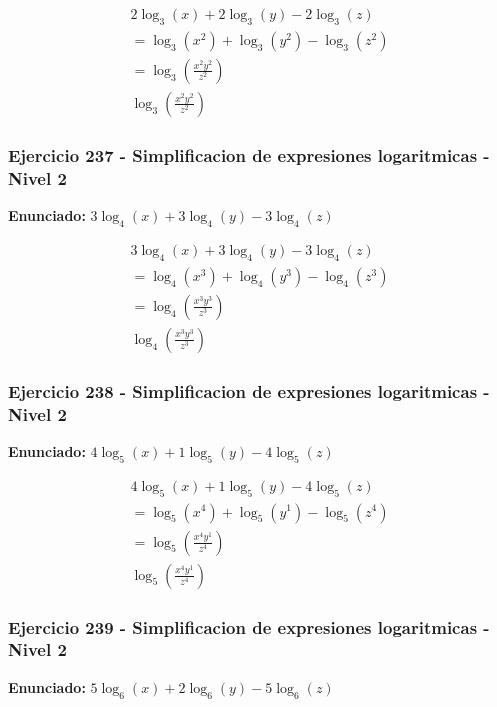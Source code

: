 \documentclass[12pt,a4paper]{article}
\begin{document}
\[
\begin{aligned}
2\log_{3}\left(x\right)+2\log_{3}\left(y\right)-2\log_{3}\left(z\right)\\
=\log_{3}\left(x^{2}\right)+\log_{3}\left(y^{2}\right)-\log_{3}\left(z^{2}\right)\\
=\log_{3}\left(\frac{x^{2}y^{2}}{z^{2}}\right)\\
\boxed{\log_{3}\left(\frac{x^{2}y^{2}}{z^{2}}\right)}
\end{aligned}
\]


\subsubsection*{Ejercicio 237 - Simplificacion de expresiones logaritmicas - Nivel 2}
\textbf{Enunciado:} \(3\log_{4}\left(x\right)+3\log_{4}\left(y\right)-3\log_{4}\left(z\right)\)

\[
\begin{aligned}
3\log_{4}\left(x\right)+3\log_{4}\left(y\right)-3\log_{4}\left(z\right)\\
=\log_{4}\left(x^{3}\right)+\log_{4}\left(y^{3}\right)-\log_{4}\left(z^{3}\right)\\
=\log_{4}\left(\frac{x^{3}y^{3}}{z^{3}}\right)\\
\boxed{\log_{4}\left(\frac{x^{3}y^{3}}{z^{3}}\right)}
\end{aligned}
\]


\subsubsection*{Ejercicio 238 - Simplificacion de expresiones logaritmicas - Nivel 2}
\textbf{Enunciado:} \(4\log_{5}\left(x\right)+1\log_{5}\left(y\right)-4\log_{5}\left(z\right)\)

\[
\begin{aligned}
4\log_{5}\left(x\right)+1\log_{5}\left(y\right)-4\log_{5}\left(z\right)\\
=\log_{5}\left(x^{4}\right)+\log_{5}\left(y^{1}\right)-\log_{5}\left(z^{4}\right)\\
=\log_{5}\left(\frac{x^{4}y^{1}}{z^{4}}\right)\\
\boxed{\log_{5}\left(\frac{x^{4}y^{1}}{z^{4}}\right)}
\end{aligned}
\]


\subsubsection*{Ejercicio 239 - Simplificacion de expresiones logaritmicas - Nivel 2}
\textbf{Enunciado:} \(5\log_{6}\left(x\right)+2\log_{6}\left(y\right)-5\log_{6}\left(z\right)\)
\end{document}
